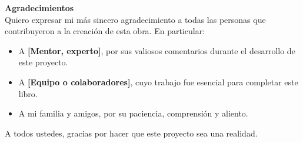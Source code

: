 
\thispagestyle{empty} %


\vspace*{2cm}

{\Huge \textbf{Agradecimientos}} \\[1.0cm]
 

Quiero expresar mi más sincero agradecimiento a todas las personas que contribuyeron a la creación de esta obra. En particular:

\begin{center}
\begin{itemize}
    \item A \textbf{[Mentor, experto]}, por sus valiosos comentarios durante el desarrollo de este proyecto.
    \item A \textbf{[Equipo o colaboradores]}, cuyo trabajo fue esencial para completar este libro.
    \item A mi familia y amigos, por su paciencia, comprensión y aliento.
\end{itemize}
\end{center}
A todos ustedes, gracias por hacer que este proyecto sea una realidad.
\clearpage